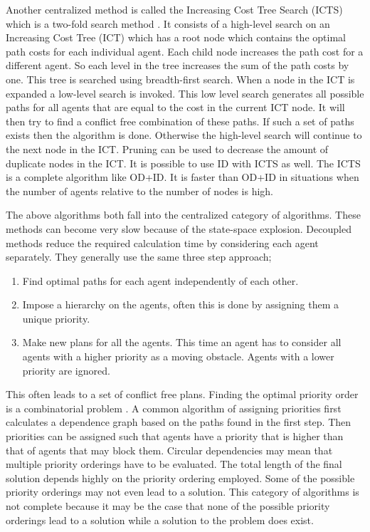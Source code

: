 Another centralized method is called the Increasing Cost Tree Search (ICTS)
which is a
two-fold search method \cite{sharon2013}. It consists of a high-level search on
an Increasing Cost Tree (ICT) which has a root node which contains the optimal
path costs for each individual agent. Each child node increases the path cost
for a different agent. So each level in the tree increases the sum of the path
costs by one. This tree is searched using breadth-first search. When a node in
the ICT is expanded a low-level search is invoked. This low level search
generates all possible paths for all agents that are equal to the cost in the
current
ICT node. It will then try to find a conflict free combination of these paths.
If such a set of paths exists then the algorithm is done. Otherwise the
high-level search will continue to the next node in the ICT. Pruning can be
used to decrease the amount of duplicate nodes in the ICT. It is possible
to use ID with ICTS as well. The ICTS is a complete algorithm like OD+ID. It is
faster than OD+ID in situations when the number of agents relative to the
number of nodes is high.


The above algorithms both fall into the centralized category of algorithms.
These methods can become very slow because of the state-space explosion.
Decoupled methods reduce the required calculation time by considering each
agent separately. They generally use the same three step approach;
\begin{enumerate}
    \item Find optimal paths for each agent independently of each other.
    \item Impose a hierarchy on the agents, often this is done by assigning
    them a unique priority.
    \item Make new plans for all the agents. This time an agent has to consider
    all agents with a higher priority as a moving obstacle. Agents with a lower
    priority are ignored.
\end{enumerate}
This often leads to a set of conflict free plans. Finding the optimal priority
order is a combinatorial problem \cite{bennewitz2002}. A common algorithm of
assigning priorities first calculates a dependence graph based on the paths
found in the first step. Then priorities can be assigned such that agents have
a priority that is higher than that of agents that may block them. Circular
dependencies may mean that multiple priority orderings have to be evaluated. The
total length of the final solution depends highly on the priority ordering
employed.
Some of the possible priority orderings may not even lead to a solution. This
category of algorithms is not complete because it may be the case that none of
the possible priority orderings lead to a solution while a solution to the
problem does exist.

